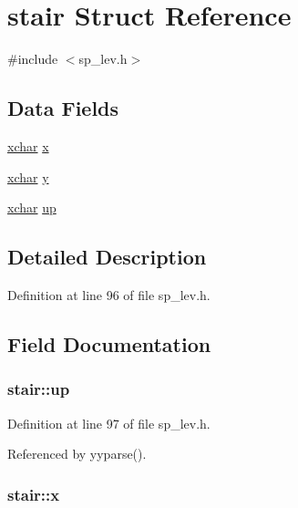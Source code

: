 \hypertarget{structstair}{\section{stair Struct Reference}
\label{structstair}
}


{\ttfamily \#include $<$sp\+\_\+lev.\+h$>$}

\subsection*{Data Fields}
\begin{DoxyCompactItemize}
\item 
\hyperlink{global_8h_a2043b7d01ce89f4ee2fa6c345a752d32}{xchar} \hyperlink{structstair_ac2d7a1ec9399eeac8fc9b72f1a8bb402}{x}
\item 
\hyperlink{global_8h_a2043b7d01ce89f4ee2fa6c345a752d32}{xchar} \hyperlink{structstair_adb9f18b03852a2f5603811f0c3709d5a}{y}
\item 
\hyperlink{global_8h_a2043b7d01ce89f4ee2fa6c345a752d32}{xchar} \hyperlink{structstair_afa205e9ad096655d5e5f988797d5e92f}{up}
\end{DoxyCompactItemize}


\subsection{Detailed Description}


Definition at line 96 of file sp\+\_\+lev.\+h.



\subsection{Field Documentation}
\hypertarget{structstair_afa205e9ad096655d5e5f988797d5e92f}{
\subsubsection[{up}]{ stair\+::up}}\label{structstair_afa205e9ad096655d5e5f988797d5e92f}


Definition at line 97 of file sp\+\_\+lev.\+h.



Referenced by yyparse().

\hypertarget{structstair_ac2d7a1ec9399eeac8fc9b72f1a8bb402}{
\subsubsection[{x}]{ stair\+::x}}\label{structstair_ac2d7a1ec9399eeac8fc9b72f1a8bb402}


